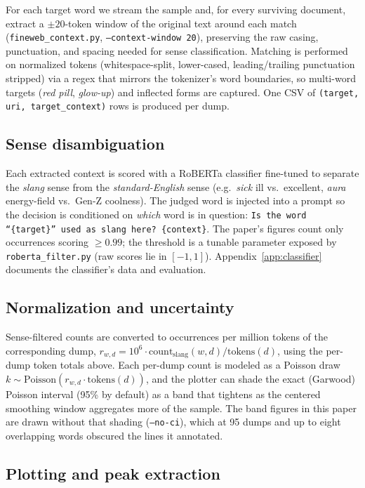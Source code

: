 \documentclass[11pt]{article}
\begin{document}
For each target word we stream the sample and, for every surviving document, extract a $\pm 20$-token window of the original text around each match (\texttt{fineweb\_context.py}, \texttt{--context-window 20}), preserving the raw casing, punctuation, and spacing needed for sense classification. Matching is performed on normalized tokens (whitespace-split, lower-cased, leading/trailing punctuation stripped) via a regex that mirrors the tokenizer's word boundaries, so multi-word targets (\textit{red pill}, \textit{glow-up}) and inflected forms are captured. One CSV of \texttt{(target, uri, target\_context)} rows is produced per dump.

\subsection{Sense disambiguation}

Each extracted context is scored with a RoBERTa classifier fine-tuned to separate the \textit{slang} sense from the \textit{standard-English} sense (e.g.\ \textit{sick} ill vs.\ excellent, \textit{aura} energy-field vs.\ Gen-Z coolness). The judged word is injected into a prompt so the decision is conditioned on \textit{which} word is in question: \texttt{Is the word ``\{target\}'' used as slang here? \{context\}}. The paper's figures count only occurrences scoring $\geq 0.99$; the threshold is a tunable parameter exposed by \texttt{roberta\_filter.py} (raw scores lie in $[-1,1]$). Appendix~\ref{app:classifier} documents the classifier's data and evaluation.

\subsection{Normalization and uncertainty}

Sense-filtered counts are converted to occurrences per million tokens of the corresponding dump, $r_{w,d} = 10^{6}\cdot \text{count}_{\text{slang}}(w,d) / \text{tokens}(d)$, using the per-dump token totals above. Each per-dump count is modeled as a Poisson draw $k \sim \text{Poisson}(r_{w,d}\cdot\text{tokens}(d))$, and the plotter can shade the exact (Garwood) Poisson interval (95\% by default) as a band that tightens as the centered smoothing window aggregates more of the sample. The band figures in this paper are drawn without that shading (\texttt{--no-ci}), which at 95 dumps and up to eight overlapping words obscured the lines it annotated.

\subsection{Plotting and peak extraction}
\end{document}
